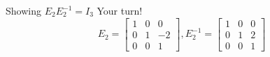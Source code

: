 \documentclass[xcoler=dvipsnames, aspectratio=169]{beamer}
\begin{document}
    \begin{frame}{Showing $E_2E_2^{-1}=I_3$}
        Your turn!
        \[
            E_2 = \begin{bmatrix}1&0&0\\0&1&-2\\0&0&1\end{bmatrix}, 
            E^{-1}_2 = \begin{bmatrix}1&0&0\\0&1&2\\0&0&1\end{bmatrix}
        \]
        \iftoggle{showSolutions}{
        \[
            E_2E^{-1}_2 = \begin{bmatrix}1&0&0\\0&1&-2\\0&0&1\end{bmatrix}\begin{bmatrix}1&0&0\\0&1&2\\0&0&1\end{bmatrix} 
                \pause = \begin{bmatrix}1\\0\\0\end{bmatrix}\begin{bmatrix}1&0&0\end{bmatrix} + \begin{bmatrix}0\\1\\0\end{bmatrix}
                    \begin{bmatrix}0&1&2\end{bmatrix} + \begin{bmatrix}0\\-2\\1\end{bmatrix}\begin{bmatrix}0&0&1\end{bmatrix}\pause
        \]
        \[
            =\begin{bmatrix}1&0&0\\0&0&0\\0&0&0\end{bmatrix} + \begin{bmatrix}0&0&0\\0&1&2\\0&0&0\end{bmatrix}
                + \begin{bmatrix}0&0&0\\0&0&-2\\0&0&1\end{bmatrix}\pause = \begin{bmatrix}1&0&0\\0&1&0\\0&0&1\end{bmatrix}
                    \pause\checkmark
        \]
        }{\vspace{130pt}}
    \end{frame}
\end{document}
